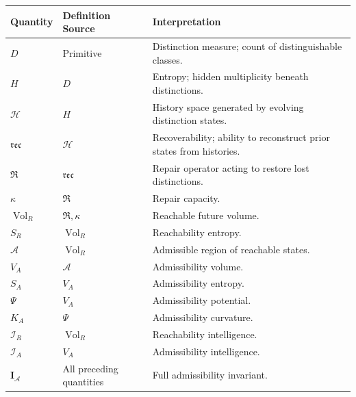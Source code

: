 \documentclass[12pt,twoside,openright]{book}
\newcommand{\hist}{\mathcal{H}}
\newcommand{\repair}{\mathfrak{R}}
\newcommand{\reco}{\mathfrak{rec}}
\newcommand{\Vol}{\operatorname{Vol}}
\begin{document}
\begin{center}
\small
\begin{longtable}{p{3cm}p{4cm}p{7cm}}
\toprule
Quantity & Definition Source & Interpretation \\
\midrule
\endhead

$D$
&
Primitive
&
Distinction measure; count of distinguishable classes.
\\

$H$
&
$D$
&
Entropy; hidden multiplicity beneath distinctions.
\\

$\hist$
&
$H$
&
History space generated by evolving distinction states.
\\

$\reco$
&
$\hist$
&
Recoverability; ability to reconstruct prior states from
histories.
\\

$\repair$
&
$\reco$
&
Repair operator acting to restore lost distinctions.
\\

$\kappa$
&
$\repair$
&
Repair capacity.
\\

$\Vol_R$
&
$\repair,\kappa$
&
Reachable future volume.
\\

$S_R$
&
$\Vol_R$
&
Reachability entropy.
\\

$\mathcal A$
&
$\Vol_R$
&
Admissible region of reachable states.
\\

$V_A$
&
$\mathcal A$
&
Admissibility volume.
\\

$S_A$
&
$V_A$
&
Admissibility entropy.
\\

$\Psi$
&
$V_A$
&
Admissibility potential.
\\

$K_A$
&
$\Psi$
&
Admissibility curvature.
\\

$\mathcal I_R$
&
$\Vol_R$
&
Reachability intelligence.
\\

$\mathcal I_A$
&
$V_A$
&
Admissibility intelligence.
\\

$\mathbf I_{\mathcal A}$
&
All preceding quantities
&
Full admissibility invariant.
\\

\bottomrule
\end{longtable}
\end{center}
\end{document}
